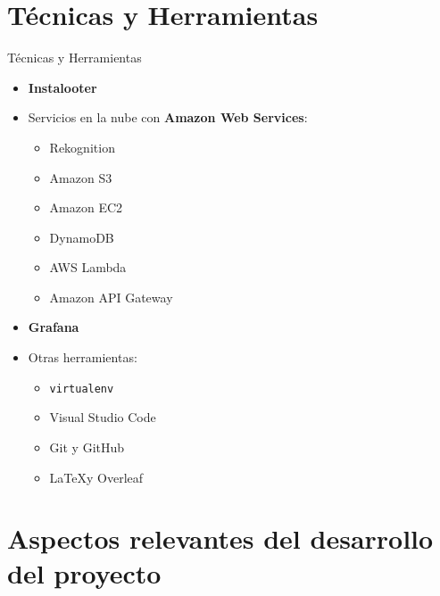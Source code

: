 \documentclass[aspectratio=149]{beamer}
\begin{document}
\section{Técnicas y Herramientas}
\begin{frame}[label=herramientas]{Técnicas y Herramientas}
    \begin{itemize}
        \item \textbf{Instalooter}
        \item Servicios en la nube con \textbf{Amazon Web Services}:
        \begin{itemize}
            \item Rekognition
            \item Amazon S3
            \item Amazon EC2
            \item DynamoDB
            \item AWS Lambda
            \item Amazon API Gateway
        \end{itemize}
        \item \textbf{Grafana}
        \item Otras herramientas:
        \begin{itemize}
            \item \texttt{virtualenv}
            \item Visual Studio Code
            \item Git y GitHub
            \item \LaTeX y Overleaf
        \end{itemize}
    \end{itemize}
\end{frame}

\section{Aspectos relevantes del desarrollo del proyecto}
\end{document}
